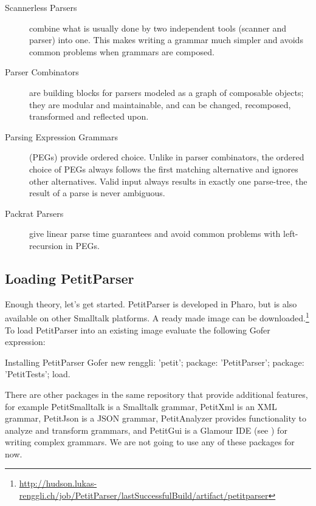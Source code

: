 \documentclass[a4paper,10pt,twoside]{book}
\begin{document}
\begin{description}
\item[Scannerless Parsers] combine what is usually done by two
  independent tools (scanner and parser) into one. This makes writing
  a grammar much simpler and avoids common problems when grammars are
  composed.

\item[Parser Combinators] are building blocks for parsers modeled as a
  graph of composable objects; they are modular and maintainable, and
  can be changed, recomposed, transformed and reflected upon.

\item[Parsing Expression Grammars] (PEGs) provide ordered choice. Unlike in
  parser combinators, the ordered choice of PEGs always follows the
  first matching alternative and ignores other alternatives. Valid
  input always results in exactly one parse-tree, the result of a
  parse is never ambiguous.

\item[Packrat Parsers] give linear parse time guarantees and avoid
  common problems with left-recursion in PEGs.
\end{description}


\subsection{Loading PetitParser}

Enough theory, let's get started. PetitParser is developed in Pharo,
but is also available on other Smalltalk platforms. A ready made image
can be
downloaded.\footnote{\url{http://hudson.lukas-renggli.ch/job/PetitParser/lastSuccessfulBuild/artifact/petitparser}}
To load PetitParser into an existing image evaluate the following
Gofer expression:

\begin{script}{Installing PetitParser}
Gofer new
  renggli: 'petit';
  package: 'PetitParser';
  package: 'PetitTests';
  load.
\end{script}

There are other packages in the same repository that provide
additional features, for example PetitSmalltalk is a Smalltalk
grammar, PetitXml is an XML grammar, PetitJson is a JSON grammar,
PetitAnalyzer provides functionality to analyze and transform
grammars, and PetitGui is a Glamour IDE (see ) for
writing complex grammars. We are not going to use any of these
packages for now.
\end{document}
